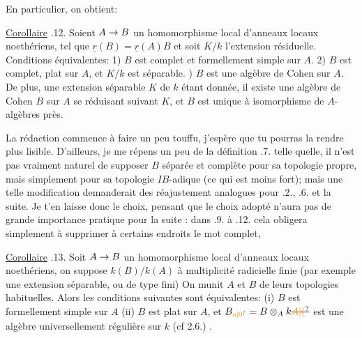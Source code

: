 
En particulier, on obtient:

\uline{Corollaire} .12. Soient $A\to B$ un homomorphisme local d'anneaux locaux noethériens, tel que $\underline{r}(B)=\underline{r}(A)B$ et  soit $K/k$ l'extension résiduelle. Conditions équivalentes: 1) $B$ est complet et formellement simple sur $A$. 2) $B$ est complet, plat sur $A$, et $K/k$ est séparable. ) $B$ est une algèbre de Cohen sur $A$. De plus, une extension séparable $K$ de $k$ étant donnée, il existe une algèbre de Cohen $B$ sur $A$ se réduisant suivant $K$, et $B$ est unique à isomorphisme de $A$-algèbres près.

La rédaction commence à faire un peu touffu, j'espère que tu pourras la rendre plus lisible. D'ailleurs, je me répens un peu de la définition .7. telle quelle, il n'est pas vraiment naturel de supposer $B$ séparée et complète pour sa topologie propre, mais simplement pour sa topologie $IB$-adique (ce qui est moins fort); mais une telle modification demanderait des réajustement analogues pour .2., .6. et la suite. Je t'en laisse donc le choix, pensant que le choix adopté n'aura pas de grande importance pratique pour la suite : dans .9. à .12. cela obligera simplement à supprimer à certains endroits le mot \textquotedbl{}complet\textquotedbl{}, 


\uline{Corollaire} .13. Soit $A\to B$ un homomorphisme local d'anneaux locaux noethériens, on suppose $k(B)/k(A)$ à multiplicité radicielle finie (par exemple une extension séparable, ou de type fini)\handwritten{,}  On munit $A$ et $B$ de leurs topologies habituelles. Alors les conditions suivantes sont équivalentes: (i) $B$ est formellement simple sur $A$ (ii) $B$ est plat sur $A$, et $B_{\unsure{o|0}}=B\otimes_A k\deleted{\unsure{A|(}}$ est une algèbre universellement régulière sur $k$ (cf 2.6.) .

